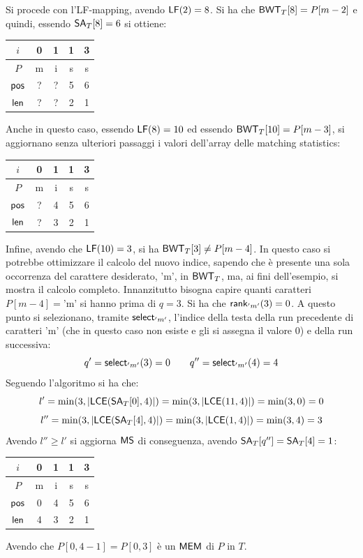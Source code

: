 \begin{esempio}
\begin{table}[H]
\begin{tabular}{c||c|c|c|c}
    \end{tabular}
  \end{table}
  Si procede con l'LF-mapping, avendo $\mbox{\rm {\sf LF}}(2)=8$. Si ha che
  $\mbox{\rm {\sf BWT}}_T[8]=P[m-2]$ e quindi, essendo $\mbox{\rm {\sf SA}}_T[8]=6$ si ottiene:
  \begin{table}[H]
    \centering
    \begin{tabular}{c||c|c|c|c}
      $i$ & 0 & 1 & 1 & 3 \\
      \hline
      $P$ & m & i & s & s \\
      \hline
      \hline
      $\mbox{\rm {\sf pos}}$ & ? & ? & 5 & 6\\
      \hline
      $\mbox{\rm {\sf len}}$& ? & ? & 2 & 1\\
    \end{tabular}
  \end{table}
  Anche in questo caso, essendo $\mbox{\rm {\sf LF}}(8)=10$ ed essendo $\mbox{\rm {\sf BWT}}_T[10]=P[m-3]$, si
  aggiornano senza ulteriori passaggi i valori dell'array delle matching
  statistics: 
  \begin{table}[H]
    \centering
    \begin{tabular}{c||c|c|c|c}
      $i$ & 0 & 1 & 1 & 3 \\
      \hline
      $P$ & m & i & s & s \\
      \hline
      \hline
      $\mbox{\rm {\sf pos}}$ & ? & 4 & 5 & 6\\
      \hline
      $\mbox{\rm {\sf len}}$ & ? & 3 & 2 & 1\\
    \end{tabular}
  \end{table}
  Infine, avendo che $\mbox{\rm {\sf LF}}(10)=3$, si ha $\mbox{\rm {\sf BWT}}_T[3]\neq P[m-4]$. In questo caso si
  potrebbe ottimizzare il calcolo del nuovo indice, sapendo che è presente una
  sola occorrenza del carattere desiderato, $\mbox{'m'}$, in $\mbox{\rm {\sf BWT}}_T$, ma, ai
  fini dell'esempio, si mostra il calcolo completo. Innanzitutto bisogna capire
  quanti caratteri $P[m-4]=\mbox{'m'}$ si hanno prima di $q=3$. Si ha che
  $\mbox{\rm {\sf rank}}_{'m'}(3)=0$. A questo punto si selezionano, tramite $\mbox{\rm {\sf select}}_{'m'}$,
  l'indice della
  testa della run precedente di caratteri $\mbox{'m'}$ (che in questo caso non
  esiste e gli si assegna il valore 0) e della run successiva:
  \[q'=\mbox{\rm {\sf select}}_{'m'}(3)=0\quad \quad q''=\mbox{\rm {\sf select}}_{'m'}(4)=4\]
  Seguendo l'algoritmo si ha che:
  \[l'=\min(3,\left|\mbox{\rm {\sf LCE}}(\mbox{\rm {\sf SA}}_T[0],4)\right|)=\min(3,\left|\mbox{\rm {\sf LCE}}(11,4)\right|)
    =\min(3,0)=0\]
  \[l''=\min(3,\left|\mbox{\rm {\sf LCE}}(\mbox{\rm {\sf SA}}_T[4],4)\right|)=\min(3,\left|\mbox{\rm {\sf LCE}}(1,4)\right|)
    =\min(3,4)=3\]
  Avendo $l''\geq l'$ si aggiorna $\mbox{\rm {\sf MS}}$ di conseguenza, avendo
  $\mbox{\rm {\sf SA}}_T[q'']=\mbox{\rm {\sf SA}}_T[4]=1$: 
  \begin{table}[H]
    \centering
    \begin{tabular}{c||c|c|c|c}
      $i$ & 0 & 1 & 1 & 3 \\
      \hline
      $P$ & m & i & s & s \\
      \hline
      \hline
      $\mbox{\rm {\sf pos}}$ & 0 & 4 & 5 & 6\\
      \hline
      $\mbox{\rm {\sf len}}$ & 4 & 3 & 2 & 1\\
    \end{tabular}
  \end{table}
  Avendo che $P[0,4-1]=P[0,3]$ è un $\mbox{\rm {\sf MEM}}$ di $P$ in $T$. 
\end{esempio}
